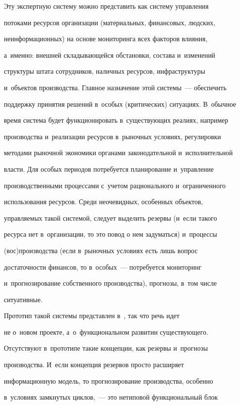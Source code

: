      Эту экспертную систему можно представить как систему управления 

потоками ресурсов организации (материальных, финансовых, людских, 

неинформационных) на основе мониторинга всех факторов влияния, 

а~именно: внешней складывающейся обстановки, состава и~изменений 

структуры штата сотрудников, наличных ресурсов, инфраструктуры 

и~объектов производства. Главное назначение этой системы~--- обеспечить 

поддержку принятия решений в~особых (критических) ситуациях. В~обычное 

время система будет функционировать в~существующих реалиях, например 

производства и~реализации ресурсов в~рыночных условиях, регулировки 

методами рыночной экономики органами законодательной и~исполнительной 

власти. Для особых периодов потребуется планирование и~управление 

производственными процессами с~учетом рационального и~ограниченного 

использования ресурсов. Среди неочевидных, особенных объектов, 

управляемых такой системой, следует выделить резервы (и~если такого 

ресурса нет в~организации, то это повод о нем задуматься) и~процессы 

(вос)производства (если в~рыночных условиях есть лишь вопрос 

достаточности финансов, то в~особых~--- потребуется мониторинг 

и~прогнозирование собственного производства), прогнозы, в~том числе 

ситуативные.

     

     Прототип такой системы представлен в~\cite{15-zh}, так что речь идет 

не о~новом проекте, а~о~функциональном развитии существующего. 

Отсутствуют в~прототипе такие концепции, как резервы и~прогнозы 

производства. И~если концепция резервов просто расширяет 

информационную модель, то прогнозирование производства, особенно 

в~условиях замкнутых циклов,~--- это нетиповой функциональный блок 

